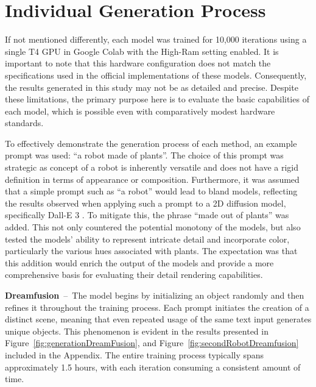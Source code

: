 \section{Individual Generation Process}\label{generationProcess}

If not mentioned differently, each model was trained for 10,000 iterations using a single T4 GPU in Google Colab with the High-Ram setting enabled. It is important to note that this hardware configuration does not match the specifications used in the official implementations of these models. Consequently, the results generated in this study may not be as detailed and precise. Despite these limitations, the primary purpose here is to evaluate the basic capabilities of each model, which is possible even with comparatively modest hardware standards.

To effectively demonstrate the generation process of each method, an example prompt was used: ``a robot made of plants''. The choice of this prompt was strategic as concept of a robot is inherently versatile and does not have a rigid definition in terms of appearance or composition. Furthermore, it was assumed that a simple prompt such as ``a robot'' would lead to bland models, reflecting the results observed when applying such a prompt to a 2D diffusion model, specifically Dall-E 3 \citep{dalle3}. To mitigate this, the phrase ``made out of plants'' was added. This not only countered the potential monotony of the models, but also tested the models' ability to represent intricate detail and incorporate color, particularly the various hues associated with plants. The expectation was that this addition would enrich the output of the models and provide a more comprehensive basis for evaluating their detail rendering capabilities.

\textbf{Dreamfusion}~--~The model begins by initializing an object randomly and then refines it throughout the training process. Each prompt initiates the creation of a distinct scene, meaning that even repeated usage of the same text input generates unique objects. This phenomenon is evident in the results presented in Figure~\ref{fig:generationDreamFusion}, and Figure~\ref{fig:secondRobotDreamfusion} included in the Appendix. The entire training process typically spans approximately 1.5 hours, with each iteration consuming a consistent amount of time.

